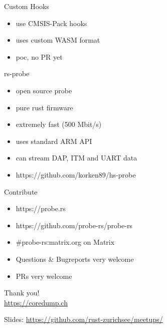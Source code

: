 \documentclass[aspectratio=1610,14pt,t]{beamer}
\begin{document}
\begin{frame}[c,fragile]{Custom Hooks}
  \begin{itemize}
    \item use CMSIS-Pack hooks
    \item uses custom WASM format
    \item poc, no PR yet
  \end{itemize}
\end{frame}

\begin{frame}[c,fragile]{rs-probe}
  \begin{itemize}
    \item open source probe
    \item pure rust firmware
    \item extremely fast (500 Mbit/s)
    \item uses standard ARM API
    \item can stream DAP, ITM and UART data
    \item https://github.com/korken89/hs-probe
  \end{itemize}
\end{frame}

\begin{frame}[c]{Contribute}
  \begin{itemize}
    \item https://probe.rs
    \item https://github.com/probe-rs/probe-rs
    \item \#probe-rs:matrix.org on Matrix
    \item Questions \& Bugreports very welcome
    \item PRs very welcome
  \end{itemize}
\end{frame}


{
\begin{frame}[standout]
  \begin{centering}
    {\Huge Thank you!}\\
    {\normalsize \url{https://coredump.ch}}\\
  \end{centering}
  {\small Slides: \url{https://github.com/rust-zurichsee/meetups/}}\\
  \vspace{3cm}
\end{frame}
}
\end{document}
